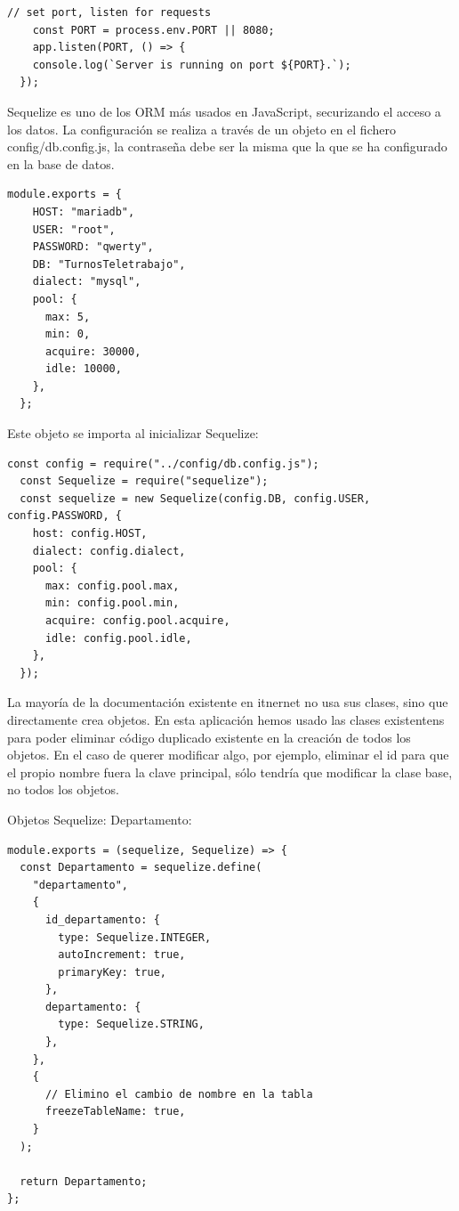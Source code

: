 \documentclass[11pt,spanish,listoffigures,listoftables]{tfgetsinf}
\begin{document}
  \begin{lstlisting}[style=ES6, caption={ES6 (ECMAScript-2015) Listing}]
    // set port, listen for requests
    const PORT = process.env.PORT || 8080;
    app.listen(PORT, () => {
    console.log(`Server is running on port ${PORT}.`);
  });
    \end{lstlisting}

Sequelize es uno de los ORM más usados en JavaScript, securizando el acceso a los datos. La configuración se realiza a través de un objeto en el fichero config/db.config.js, la contraseña debe ser la misma que la que se ha configurado en la base de datos.
\begin{lstlisting}[style=ES6, caption={ES6 (ECMAScript-2015) Listing}]
  module.exports = {
    HOST: "mariadb",
    USER: "root",
    PASSWORD: "qwerty",
    DB: "TurnosTeletrabajo",
    dialect: "mysql",
    pool: {
      max: 5,
      min: 0,
      acquire: 30000,
      idle: 10000,
    },
  };
  \end{lstlisting}
Este objeto se importa al inicializar Sequelize:
\begin{lstlisting}[style=ES6, caption={ES6 (ECMAScript-2015) Listing}]
  const config = require("../config/db.config.js");
  const Sequelize = require("sequelize");
  const sequelize = new Sequelize(config.DB, config.USER, config.PASSWORD, {
    host: config.HOST,
    dialect: config.dialect,
    pool: {
      max: config.pool.max,
      min: config.pool.min,
      acquire: config.pool.acquire,
      idle: config.pool.idle,
    },
  });
  \end{lstlisting}

La mayoría de la documentación existente en itnernet no usa sus clases, sino que directamente crea objetos. En esta aplicación hemos usado las clases existentens para poder eliminar código duplicado existente en la creación de todos los objetos.
En el caso de querer modificar algo, por ejemplo, eliminar el id para que el propio nombre fuera la clave principal, sólo tendría que modificar la clase base, no todos los objetos.

Objetos Sequelize:
Departamento:

\begin{lstlisting}[style=ES6, caption={ES6 (ECMAScript-2015) Listing}]
module.exports = (sequelize, Sequelize) => {
  const Departamento = sequelize.define(
    "departamento",
    {
      id_departamento: {
        type: Sequelize.INTEGER,
        autoIncrement: true,
        primaryKey: true,
      },
      departamento: {
        type: Sequelize.STRING,
      },
    },
    {
      // Elimino el cambio de nombre en la tabla
      freezeTableName: true,
    }
  );

  return Departamento;
};
\end{lstlisting}
\end{document}
